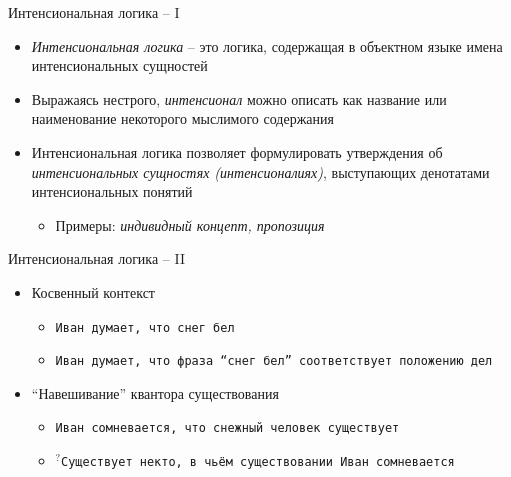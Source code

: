\documentclass{beamer}
\begin{document}
\begin{frame}{Интенсиональная логика -- I}
\begin{itemize}
	\item \textit{Интенсиональная логика} -- это логика, содержащая в объектном языке имена интенсиональных сущностей
	\medskip
	\item Выражаясь нестрого, \textit{интенсионал} можно описать как название или наименование некоторого мыслимого содержания
	\medskip
	\item Интенсиональная логика позволяет формулировать утверждения об \textit{интенсиональных сущностях (интенсионалиях)}, выступающих денотатами интенсиональных понятий
	    \medskip
	    {\small
	    \begin{itemize}
	        \item Примеры: \textit{индивидный концепт, пропозиция}
	    \end{itemize}
	    }
\end{itemize}
\end{frame}

\begin{frame}{Интенсиональная логика -- II}
\begin{itemize}
    \item Косвенный контекст
    	\medskip
	    \begin{itemize}
	        \item \texttt{Иван думает, что снег бел}
	        \smallskip
	        \item \texttt{Иван думает, что фраза ``снег бел'' соответствует положению дел}
	    \end{itemize}    
	\medskip
    \item ``Навешивание'' квантора существования
    	\medskip
	    \begin{itemize}
	        \item \texttt{Иван сомневается, что снежный человек существует}
	        \smallskip
	        \item $^?$\texttt{Существует некто, в чьём существовании Иван сомневается}
	    \end{itemize}   	
\end{itemize}
\end{frame}
\end{document}
